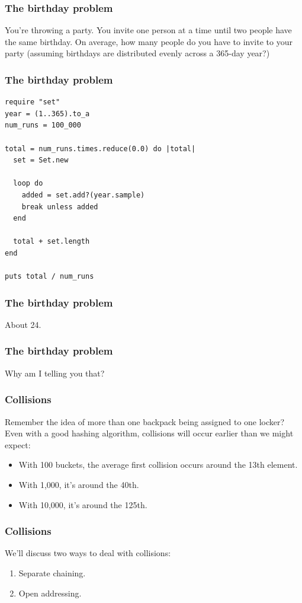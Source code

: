 \documentclass[aspectratio=169]{beamer}
\begin{document}
\begin{frame}
    \frametitle{The birthday problem}

    You're throwing a party. You invite one person at a time until two people
    have the same birthday. On average, how many people do you have to invite
    to your party (assuming birthdays are distributed evenly across a 365-day
    year?)
\end{frame}

\begin{frame}[fragile]
    \frametitle{The birthday problem}
    \begin{lstlisting}
require "set"
year = (1..365).to_a
num_runs = 100_000

total = num_runs.times.reduce(0.0) do |total|
  set = Set.new
  
  loop do    
    added = set.add?(year.sample)
    break unless added
  end

  total + set.length
end

puts total / num_runs
    \end{lstlisting}
\end{frame}

\begin{frame}
    \frametitle{The birthday problem}

    About 24.
\end{frame}

\begin{frame}
    \frametitle{The birthday problem}

    Why am I telling you that?
\end{frame}

\begin{frame}
    \frametitle{Collisions}
    Remember the idea of more than one backpack being assigned to one locker?
    Even with a good hashing algorithm, collisions will occur earlier than we
    might expect:

    \begin{itemize}
        \item With 100 buckets, the average first collision occurs around the
              13th element.
        \item With 1,000, it's around the 40th. 
        \item With 10,000, it's around the 125th.
    \end{itemize}
\end{frame}

\begin{frame}
    \frametitle{Collisions}
    We'll discuss two ways to deal with collisions:

    \begin{enumerate}
        \item Separate chaining.
        \item Open addressing.
    \end{enumerate}
\end{frame}
\end{document}
